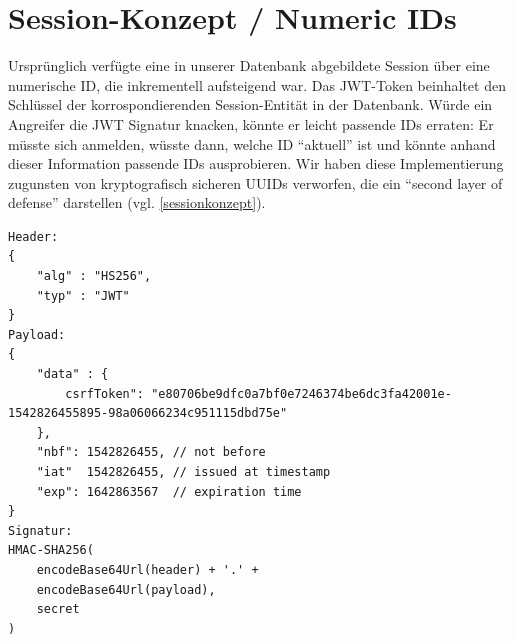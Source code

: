 \documentclass[12pt,DIV14,BCOR10mm,a4paper,parskip=half-,headsepline,headinclude,english,ngerman,bibliography=totocnumbered]{scrreprt}
\begin{document}
\section{Session-Konzept / Numeric IDs}
Ursprünglich verfügte eine in unserer Datenbank abgebildete Session über eine numerische ID, die inkrementell aufsteigend war. Das JWT-Token beinhaltet den Schlüssel der korrospondierenden Session-Entität in der Datenbank. Würde ein Angreifer die JWT Signatur knacken, könnte er leicht passende IDs erraten: Er müsste sich anmelden, wüsste dann, welche ID \enquote{aktuell} ist und könnte anhand dieser Information passende IDs ausprobieren. Wir haben diese Implementierung zugunsten von kryptografisch sicheren UUIDs verworfen, die ein \enquote{second layer of defense} darstellen (vgl. \ref{sessionkonzept}).

\printbibliography

\printacronyms[title=Abkürzungsverzeichnis,toctitle=Abkürzungsverzeichnis]
\printglossary[title=Glossar,toctitle=Glossar,type=main]

\iftotalfigures
  \listoffigures
\fi


\begin{appendices}

\begin{lstlisting}[label=jwtformat, caption={Aufbau eines JSON Web Token},captionpos=b]
Header:
{
	"alg" : "HS256",
	"typ" : "JWT"
}
Payload:
{
	"data" : {
		csrfToken": "e80706be9dfc0a7bf0e7246374be6dc3fa42001e-1542826455895-98a06066234c951115dbd75e"
	},
	"nbf": 1542826455, // not before
	"iat"  1542826455, // issued at timestamp
	"exp": 1642863567  // expiration time
}
Signatur:
HMAC-SHA256(
	encodeBase64Url(header) + '.' +
	encodeBase64Url(payload),
	secret
)
\end{lstlisting}

\end{appendices}
\end{document}
